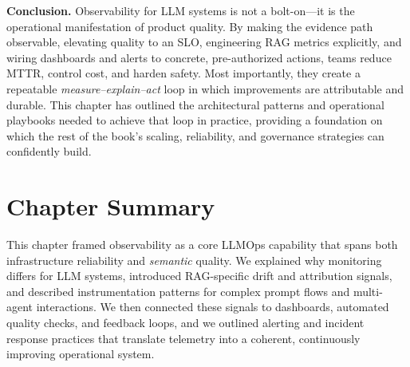 \medskip
\noindent\textbf{Conclusion.}
Observability for LLM systems is not a bolt-on---it is the operational manifestation of product quality. By making the evidence path observable, elevating quality to an SLO, engineering RAG metrics explicitly, and wiring dashboards and alerts to concrete, pre-authorized actions, teams reduce MTTR, control cost, and harden safety. Most importantly, they create a repeatable \emph{measure–explain–act} loop in which improvements are attributable and durable. This chapter has outlined the architectural patterns and operational playbooks needed to achieve that loop in practice, providing a foundation on which the rest of the book’s scaling, reliability, and governance strategies can confidently build.

\section*{Chapter Summary}
This chapter framed observability as a core LLMOps capability that spans both infrastructure reliability and \emph{semantic} quality. We explained why monitoring differs for LLM systems, introduced RAG-specific drift and attribution signals, and described instrumentation patterns for complex prompt flows and multi-agent interactions. We then connected these signals to dashboards, automated quality checks, and feedback loops, and we outlined alerting and incident response practices that translate telemetry into a coherent, continuously improving operational system.

\printbibliography[
  heading=subbibliography,
  segment=\therefsegment,
  resetnumbers=true
]

